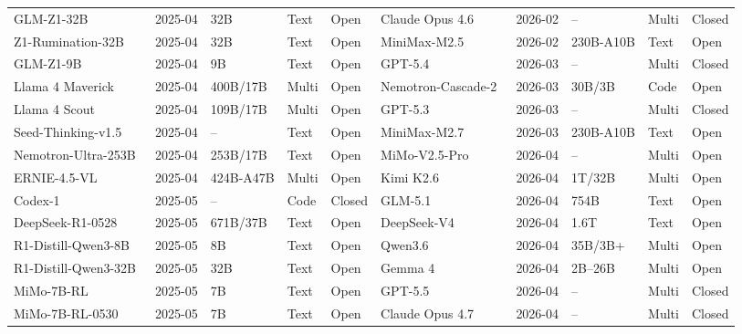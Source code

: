 \begin{table}[htbp]
{\begin{tabular}{@{} lllll | lllll @{}}
GLM-Z1-32B~\cite{zai2025glm40414} & 2025-04 & 32B & Text & Open & Claude Opus 4.6~\cite{anthropic2026claudeopus46} & 2026-02 & -- & Multi & Closed \\
Z1-Rumination-32B~\cite{zai2025glm40414} & 2025-04 & 32B & Text & Open & MiniMax-M2.5~\cite{minimax2026minimaxm25} & 2026-02 & 230B-A10B & Text & Open \\
GLM-Z1-9B~\cite{zai2025glm40414} & 2025-04 & 9B & Text & Open & GPT-5.4~\cite{openai2026gpt54} & 2026-03 & -- & Multi & Closed \\
Llama 4 Maverick~\cite{meta2025llama4} & 2025-04 & 400B/17B & Multi & Open & Nemotron-Cascade-2~\cite{nvidia2026nemotroncascade2} & 2026-03 & 30B/3B & Code & Open \\
Llama 4 Scout~\cite{meta2025llama4} & 2025-04 & 109B/17B & Multi & Open & GPT-5.3~\cite{openai2026gpt53instant} & 2026-03 & -- & Multi & Closed \\
Seed-Thinking-v1.5~\cite{bytedanceseed2025seedthinking} & 2025-04 & -- & Text & Open & MiniMax-M2.7~\cite{minimax2026minimaxm27} & 2026-03 & 230B-A10B & Text & Open \\
Nemotron-Ultra-253B~\cite{bercovich2025llamanemotron} & 2025-04 & 253B/17B & Text & Open & MiMo-V2.5-Pro~\cite{xiaomi2026mimov25pro} & 2026-04 & -- & Multi & Open \\
ERNIE-4.5-VL~\cite{baidu2025ernie45technicalreport} & 2025-04 & 424B-A47B & Multi & Open & Kimi K2.6~\cite{moonshotai2026kimik26} & 2026-04 & 1T/32B & Multi & Open \\
Codex-1~\cite{openai2025codex} & 2025-05 & -- & Code & Closed & GLM-5.1~\cite{zai2026glm51} & 2026-04 & 754B & Text & Open \\
DeepSeek-R1-0528~\cite{deepseekai2025r10528} & 2025-05 & 671B/37B & Text & Open & DeepSeek-V4~\cite{deepseekai2026deepseekv4} & 2026-04 & 1.6T & Text & Open \\
R1-Distill-Qwen3-8B~\cite{deepseekai2025r10528} & 2025-05 & 8B & Text & Open & Qwen3.6~\cite{qwen2026qwen36} & 2026-04 & 35B/3B+ & Multi & Open \\
R1-Distill-Qwen3-32B~\cite{deepseekai2025r10528} & 2025-05 & 32B & Text & Open & Gemma 4~\cite{google2026gemma4} & 2026-04 & 2B--26B & Multi & Open \\
MiMo-7B-RL~\cite{xiaomimimo2025mimo} & 2025-05 & 7B & Text & Open & GPT-5.5~\cite{openai2026gpt55systemcard} & 2026-04 & -- & Multi & Closed \\
MiMo-7B-RL-0530~\cite{xiaomimimo2025mimo} & 2025-05 & 7B & Text & Open & Claude Opus 4.7~\cite{anthropic2026claudeopus47} & 2026-04 & -- & Multi & Closed \\

\end{tabular}}
\end{table}
